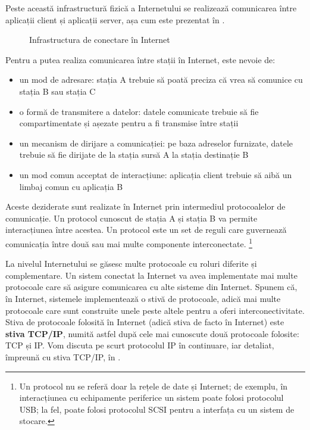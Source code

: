 Peste această infrastructură fizică a Internetului se realizează comunicarea între aplicații client și aplicații server, așa cum este prezentat în .

\begin{figure}[htbp]
  \centering
  \def\svgwidth{\columnwidth}
  
  \caption{Infrastructura de conectare în Internet}
  \label{fig:net:internet-infrastructure}
\end{figure}

Pentru a putea realiza comunicarea între stații în Internet, este nevoie de:

\begin{itemize}
  \item un mod de adresare: stația A trebuie să poată preciza că vrea să comunice cu stația B sau stația C
  \item o formă de transmitere a datelor: datele comunicate trebuie să fie compartimentate și așezate pentru a fi transmise între stații
  \item un mecanism de dirijare a comunicației: pe baza adreselor furnizate, datele trebuie să fie dirijate de la stația sursă A la stația destinație B
  \item un mod comun acceptat de interacțiune: aplicația client trebuie să aibă un limbaj comun cu aplicația B
\end{itemize}

Aceste deziderate sunt realizate în Internet prin intermediul protocoalelor de comunicație.
Un protocol cunoscut de stația A și stația B va permite interacțiunea între acestea.
Un protocol este un set de reguli care guvernează comunicația între două sau mai multe componente interconectate.
\footnote{Un protocol nu se referă doar la rețele de date și Internet; de exemplu, în interacțiunea cu echipamente periferice un sistem poate folosi protocolul USB; la fel, poate folosi protocolul SCSI pentru a interfața cu un sistem de stocare.}

La nivelul Internetului se găsesc multe protocoale cu roluri diferite și complementare.
Un sistem conectat la Internet va avea implementate mai multe protocoale care să asigure comunicarea cu alte sisteme din Internet.
Spunem că, în Internet, sistemele implementează o stivă de protocoale, adică mai multe protocoale care sunt construite unele peste altele pentru a oferi interconectivitate.
Stiva de protocoale folosită în Internet (adică stiva de facto în Internet) este \textbf{stiva TCP/IP}, numită astfel după cele mai cunoscute două protocoale folosite: TCP și IP.
Vom discuta pe scurt protocolul IP în continuare, iar detaliat, împreună cu stiva TCP/IP, în .

